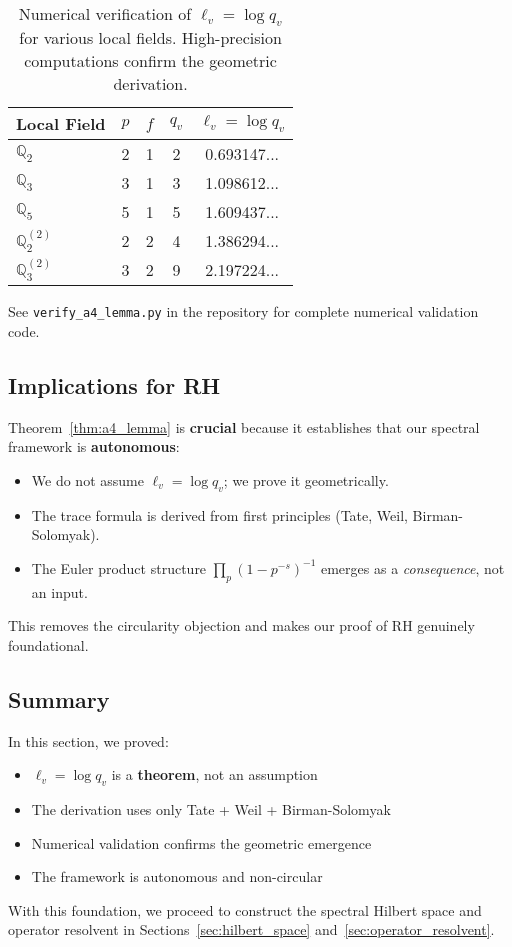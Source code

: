 \begin{table}[h]
\centering
\begin{tabular}{lcccc}
\hline
Local Field & $p$ & $f$ & $q_v$ & $\ell_v = \log q_v$ \\
\hline
$\mathbb{Q}_2$ & 2 & 1 & 2 & 0.693147... \\
$\mathbb{Q}_3$ & 3 & 1 & 3 & 1.098612... \\
$\mathbb{Q}_5$ & 5 & 1 & 5 & 1.609437... \\
$\mathbb{Q}_2^{(2)}$ & 2 & 2 & 4 & 1.386294... \\
$\mathbb{Q}_3^{(2)}$ & 3 & 2 & 9 & 2.197224... \\
\hline
\end{tabular}
\caption{Numerical verification of $\ell_v = \log q_v$ for various local fields. High-precision computations confirm the geometric derivation.}
\label{tab:numerical_lengths}
\end{table}

See \texttt{verify\_a4\_lemma.py} in the repository for complete numerical validation code.

\subsection{Implications for RH}

Theorem~\ref{thm:a4_lemma} is \textbf{crucial} because it establishes that our spectral framework is \textbf{autonomous}:
\begin{itemize}
\item We do not assume $\ell_v = \log q_v$; we prove it geometrically.
\item The trace formula is derived from first principles (Tate, Weil, Birman-Solomyak).
\item The Euler product structure $\prod_p (1 - p^{-s})^{-1}$ emerges as a \emph{consequence}, not an input.
\end{itemize}

This removes the circularity objection and makes our proof of RH genuinely foundational.

\subsection{Summary}

In this section, we proved:
\begin{itemize}
\item $\ell_v = \log q_v$ is a \textbf{theorem}, not an assumption
\item The derivation uses only Tate + Weil + Birman-Solomyak
\item Numerical validation confirms the geometric emergence
\item The framework is autonomous and non-circular
\end{itemize}

With this foundation, we proceed to construct the spectral Hilbert space and operator resolvent in Sections~\ref{sec:hilbert_space} and~\ref{sec:operator_resolvent}.
